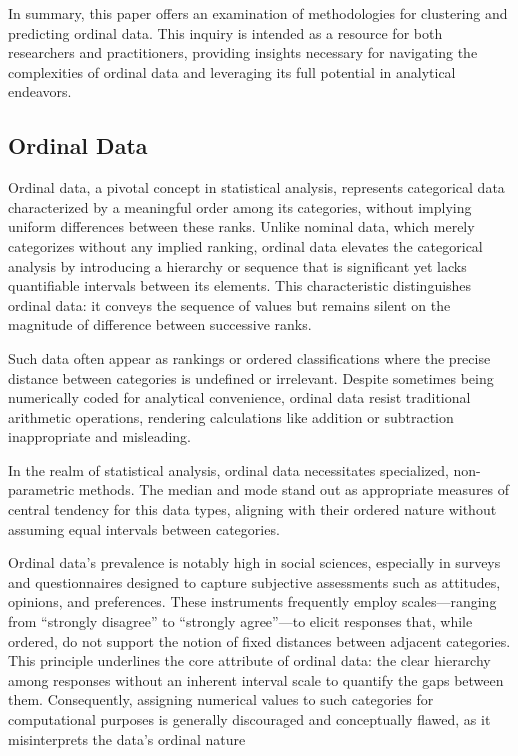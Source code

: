 \documentclass{article}
\begin{document}
In summary, this paper offers an examination of methodologies for
clustering and predicting ordinal data. This inquiry is intended as a
resource for both researchers and practitioners, providing insights
necessary for navigating the complexities of ordinal data and leveraging
its full potential in analytical endeavors.

\subsection*{Ordinal Data}

Ordinal data, a pivotal concept in statistical analysis, represents categorical data characterized by a meaningful order among its categories, without implying uniform differences between these ranks. Unlike nominal data, which merely categorizes without any implied ranking, ordinal data elevates the categorical analysis by introducing a hierarchy or sequence that is significant yet lacks quantifiable intervals between its elements. This characteristic distinguishes ordinal data: it conveys the sequence of values but remains silent on the magnitude of difference between successive ranks.

Such data often appear as rankings or ordered classifications where the precise distance between categories is undefined or irrelevant. 
Despite sometimes being numerically coded for analytical convenience, ordinal data resist traditional arithmetic operations, rendering calculations like addition or subtraction inappropriate and misleading.

In the realm of statistical analysis, ordinal data necessitates specialized, non-parametric methods. 
The median and mode stand out as appropriate measures of central tendency for this data types, 
aligning with their ordered nature without assuming equal intervals between categories.

Ordinal data's prevalence is notably high in social sciences, especially in surveys and questionnaires designed to capture subjective assessments such as attitudes, opinions, and preferences. These instruments frequently employ scales—ranging from ``strongly disagree'' to ``strongly agree''—to elicit responses that, while ordered, do not support the notion of fixed distances between adjacent categories. This principle underlines the core attribute of ordinal data: the clear hierarchy among responses without an inherent interval scale to quantify the gaps between them. Consequently, assigning numerical values to such categories for computational purposes is generally discouraged and conceptually flawed, as it misinterprets the data's ordinal nature 
\end{document}
